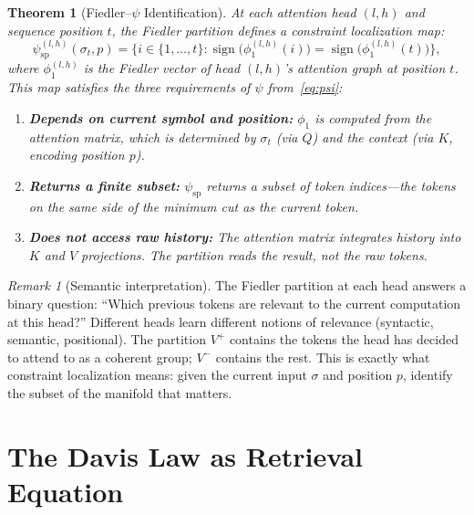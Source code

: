 \documentclass[11pt]{article}
\newtheorem{theorem}[definition]{Theorem}
\theoremstyle{remark}
\newtheorem{remark}[definition]{Remark}
\DeclareMathOperator{\sign}{sign}
\begin{document}
\begin{theorem}[Fiedler--$\psi$ Identification]\label{thm:fiedler_psi}
At each attention head $(l,h)$ and sequence position $t$, the 
Fiedler partition defines a constraint localization map:
\begin{equation}\label{eq:psi_spectral}
  \psi_{\mathrm{sp}}^{(l,h)}(\sigma_t, p) = 
  \{i \in \{1, \ldots, t\} : 
  \sign\bigl(\phi_1^{(l,h)}(i)\bigr) = 
  \sign\bigl(\phi_1^{(l,h)}(t)\bigr)\},
\end{equation}
where $\phi_1^{(l,h)}$ is the Fiedler vector of head $(l,h)$'s 
attention graph at position $t$. This map satisfies the three 
requirements of $\psi$ from~\eqref{eq:psi}:
\begin{enumerate}[nosep,label=(\roman*)]
  \item \textbf{Depends on current symbol and position:} 
    $\phi_1$ is computed from the attention matrix, which is 
    determined by $\sigma_t$ (via $Q$) and the context 
    (via $K$, encoding position $p$).
  \item \textbf{Returns a finite subset:} $\psi_{\mathrm{sp}}$ 
    returns a subset of token indices---the tokens on the same 
    side of the minimum cut as the current token.
  \item \textbf{Does not access raw history:} The attention 
    matrix integrates history into $K$ and $V$ projections. 
    The partition reads the result, not the raw tokens.
\end{enumerate}
\end{theorem}

\begin{remark}[Semantic interpretation]\label{rem:semantic}
The Fiedler partition at each head answers a binary question: 
``Which previous tokens are relevant to the current computation 
at this head?'' Different heads learn different notions of 
relevance (syntactic, semantic, positional). The partition 
$V^+$ contains the tokens the head has decided to attend to 
as a coherent group; $V^-$ contains the rest. This is exactly 
what constraint localization means: given the current input 
$\sigma$ and position $p$, identify the subset of the manifold 
that matters.
\end{remark}


\section{The Davis Law as Retrieval Equation}
\label{sec:davis_retrieval}
\end{document}
